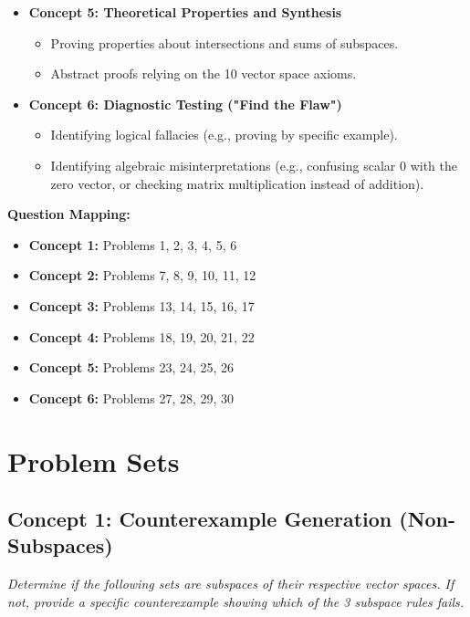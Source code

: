 \documentclass[11pt]{article}
\begin{document}
\begin{itemize}
\begin{itemize}
        \item Using row reduction (echelon form) to check for system consistency.
    \end{itemize}
    \item \textbf{Concept 5: Theoretical Properties and Synthesis}
    \begin{itemize}
        \item Proving properties about intersections and sums of subspaces.
        \item Abstract proofs relying on the 10 vector space axioms.
    \end{itemize}
    \item \textbf{Concept 6: Diagnostic Testing ("Find the Flaw")}
    \begin{itemize}
        \item Identifying logical fallacies (e.g., proving by specific example).
        \item Identifying algebraic misinterpretations (e.g., confusing scalar $0$ with the zero vector, or checking matrix multiplication instead of addition).
    \end{itemize}
\end{itemize}

\vspace{0.5cm}
\noindent \textbf{Question Mapping:}
\begin{itemize}
    \item \textbf{Concept 1:} Problems 1, 2, 3, 4, 5, 6
    \item \textbf{Concept 2:} Problems 7, 8, 9, 10, 11, 12
    \item \textbf{Concept 3:} Problems 13, 14, 15, 16, 17
    \item \textbf{Concept 4:} Problems 18, 19, 20, 21, 22
    \item \textbf{Concept 5:} Problems 23, 24, 25, 26
    \item \textbf{Concept 6:} Problems 27, 28, 29, 30
\end{itemize}

\newpage

\section{Problem Sets}

\subsection*{Concept 1: Counterexample Generation (Non-Subspaces)}
\textit{Determine if the following sets are subspaces of their respective vector spaces. If not, provide a specific counterexample showing which of the 3 subspace rules fails.}
\end{document}

